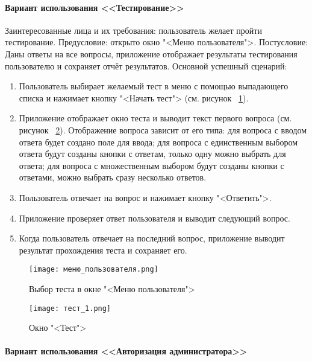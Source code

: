 \paragraph{Вариант использования <<Тестирование>>}

Заинтересованные лица и их требования: пользователь желает пройти тестирование.
\newline Предусловие: открыто окно "<Меню пользователя">.
\newline Постусловие: Даны ответы на все вопросы, приложение отображает результаты тестирования пользователю и сохраняет отчёт результатов.
\newline Основной успешный сценарий:
\begin{enumerate}
	\item Пользователь выбирает желаемый тест в меню с помощью выпадающего списка и нажимает кнопку "<Начать тест"> (см. рисунок ~\ref{user_menu_window:image}).
	\item Приложение отображает окно теста и выводит текст первого вопроса (см. рисунок ~\ref{test_window:image}). Отображение вопроса зависит от его типа: для вопроса с вводом ответа будет создано поле для ввода; для вопроса с единственным выбором ответа будут созданы кнопки с ответам, только одну можно выбрать для ответа; для вопроса с множественным выбором будут созданы кнопки с ответами, можно выбрать сразу несколько ответов.
	\item Пользователь отвечает на вопрос и нажимает кнопку "<Ответить">.
	\item Приложение проверяет ответ пользователя и выводит следующий вопрос. 
	\item Когда пользователь отвечает на последний вопрос, приложение выводит результат прохождения теста и сохраняет его.
\end{enumerate}

\newpage
\begin{figure}[ht]
	\centering
	\texttt{[image: меню\_пользователя.png]}
	\caption{Выбор теста в окне "<Меню пользователя">}
	\label{user_menu_window:image}
\end{figure}
\begin{figure}[ht]
	\centering
	\texttt{[image: тест\_1.png]}
	\caption{Окно "<Тест">}
	\label{test_window:image}
\end{figure}

\paragraph{Вариант использования <<Авторизация администратора>>}

